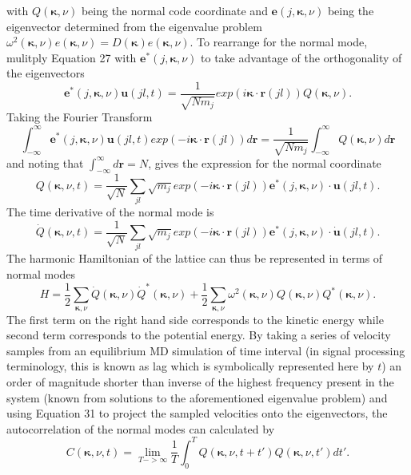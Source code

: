 with $Q(\bm{\kappa},\nu)$ being the normal code coordinate and $\bm{e}(j,\bm{\kappa},\nu)$ being the eigenvector determined from the eigenvalue problem $\omega^2(\bm{\kappa},\nu) e(\bm{\kappa},\nu)=D(\bm{\kappa})e(\bm{\kappa},\nu)$. To rearrange for the normal mode, mulitply Equation 27 with $\bm{e}^*(j,\bm{\kappa},\nu)$ to take advantage of the orthogonality of the eigenvectors
\begin{equation}
\bm{e}^*(j,\bm{\kappa},\nu)\bm{u}(jl,t)=\frac{1}{\sqrt{Nm_j}}exp(i\bm{\kappa}\cdot\bm{r}(jl))Q(\bm{\kappa},\nu).
\end{equation}
Taking the Fourier Transform
\begin{equation}
\int_{-\infty}^{\infty}\bm{e}^*(j,\bm{\kappa},\nu)\bm{u}(jl,t)exp(-i\bm{\kappa}\cdot\bm{r}(jl))d\bm{r}=\frac{1}{\sqrt{Nm_j}}\int_{-\infty}^{\infty}Q(\bm{\kappa},\nu)d\bm{r}
\end{equation}
and noting that $\int_{-\infty}^{\infty}d\bm{r}=N$, gives the expression for the normal coordinate
\begin{equation}
Q(\bm{\kappa},\nu,t)=\frac{1}{\sqrt{N}}\sum_{jl}\sqrt{m_j}exp(-i\bm{\kappa}\cdot\bm{r}(jl))\bm{e}^*(j,\bm{\kappa},\nu)\cdot\bm{u}(jl,t).
\end{equation}
The time derivative of the normal mode is
\begin{equation}
\dot{Q}(\bm{\kappa},\nu,t)=\frac{1}{\sqrt{N}}\sum_{jl}\sqrt{m_j}exp(-i\bm{\kappa}\cdot\bm{r}(jl))\bm{e}^*(j,\bm{\kappa},\nu)\cdot\dot{\bm{u}}(jl,t).
\end{equation}
The harmonic Hamiltonian of the lattice can thus be represented in terms of normal modes
\begin{equation}
H=\frac{1}{2}\sum_{\bm{\kappa},\nu}\dot{Q}(\bm{\kappa},\nu)\dot{Q}^*(\bm{\kappa},\nu)+\frac{1}{2}\sum_{\bm{\kappa},\nu}\omega^2(\bm{\kappa},\nu)Q(\bm{\kappa},\nu)Q^*(\bm{\kappa},\nu).
\end{equation}
The first term on the right hand side corresponds to the kinetic energy while second term corresponds to the potential energy. By taking a series of velocity samples from an equilibrium MD simulation of time interval (in signal processing terminology, this is known as lag which is symbolically represented here by $t$) an order of magnitude shorter than inverse of the highest frequency present in the system (known from solutions to the aforementioned eigenvalue problem) and using Equation 31 to project the sampled velocities onto the eigenvectors, the autocorrelation of the normal modes can calculated by
\begin{equation}
C(\bm{\kappa},\nu,t)=\lim_{T->\infty}\frac{1}{T}\int_{0}^{T}Q(\bm{\kappa},\nu,t+t')Q(\bm{\kappa},\nu,t')dt'.
\end{equation}
